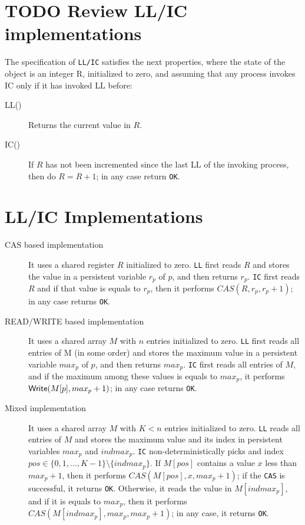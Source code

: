 \documentclass[openany, a4paper]{book}
\theoremstyle{break}
\theoremstyle{example}
\theoremstyle{note}
\theoremstyle{break}
\theoremstyle{exercise}
\newcommand{\W}{{\sf \small Write}\xspace}
\begin{document}
\section{{\bfseries\sffamily TODO} Review LL/IC implementations}
\label{sec:orgeea7d82}

The specification of \texttt{LL/IC} satisfies the next properties, where the state of
the object is an integer R, initialized to zero, and assuming that any
process invokes IC only if it has invoked LL before:

\begin{description}
\item[{LL()}] Returns the current value in \(R\).
\item[{IC()}] If \(R\) has not been incremented since the last LL of the invoking
process, then do \(R = R + 1\); in any case return \texttt{OK}.
\end{description}

\section{LL/IC Implementations}
\label{sec:orgb4cc6c9}

\begin{description}
\item[{CAS based implementation}] It uses a shared register \(R\) initialized to
zero. \texttt{LL} first reads \(R\) and stores the value in a persistent variable
\(r_p\) of \(p\), and then returns \(r_p\). \texttt{IC} first reads \(R\) and if
that value is equals to \(r_p\), then it performs \(CAS(R, r_p, r_p +
      1)\); in any case returns \texttt{OK}.
\item[{READ/WRITE based implementation}] It uses a shared array \(M\) with \(n\)
entries initialized to zero. \texttt{LL} first reads all entries of M (in some
order) and stores the maximum value in a persistent variable \(max_p\) of
\(p\), and then returns \(max_p\). \texttt{IC} first reads all entries of \(M\),
and if the maximum among these values is equals to \(max_p\), it performs
\(\W(M[p], max_p + 1)\); in any case returns \texttt{OK}.
\item[{Mixed implementation}] It uses a shared array \(M\) with \(K < n\)
entries initialized to zero. \texttt{LL} reads all entries of \(M\) and stores the
maximum value and its index in persistent variables \(max_p\) and
\(indmax_p\). \texttt{IC} non-deterministically picks and index \(pos \in \{0, 1,
      \ldots, K - 1\} \setminus \{indmax_p\}\). If \(M[pos]\) contains a value
\(x\) less than \(max_p + 1\), then it performs \(CAS(M[pos], x, max_p +
      1)\); if the \texttt{CAS} is successful, it returns \texttt{OK}. Otherwise, it reads the
value in \(M[indmax_p]\), and if it is equals to \(max_p\), then it
performs \(CAS(M[indmax_p], max_p, max_p + 1)\); in any case, it returns
\texttt{OK}.
\end{description}
\end{document}

